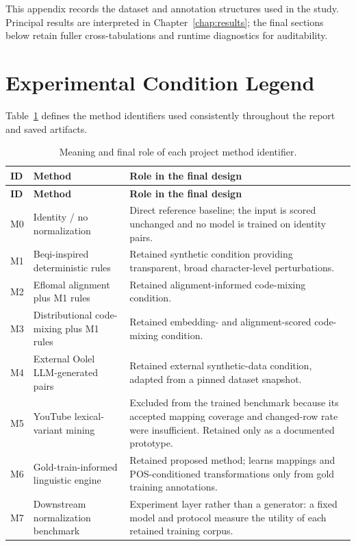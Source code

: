 \documentclass[12pt, a4paper, twoside, openany]{report}
\begin{document}
This appendix records the dataset and annotation structures used in the study. Principal results are interpreted in Chapter~\ref{chap:results}; the final sections below retain fuller cross-tabulations and runtime diagnostics for auditability.

\section{Experimental Condition Legend}

Table~\ref{tab:method-legend} defines the method identifiers used consistently throughout the report and saved artifacts.

\begin{longtable}{p{1.4cm}p{5.0cm}p{7.4cm}}
  \caption{Meaning and final role of each project method identifier.}\label{tab:method-legend}\\
  \toprule
  \textbf{ID} & \textbf{Method} & \textbf{Role in the final design} \\
  \midrule
  \endfirsthead
  \toprule
  \textbf{ID} & \textbf{Method} & \textbf{Role in the final design} \\
  \midrule
  \endhead
  M0 & Identity / no normalization & Direct reference baseline; the input is scored unchanged and no model is trained on identity pairs. \\
  M1 & Beqi-inspired deterministic rules & Retained synthetic condition providing transparent, broad character-level perturbations. \\
  M2 & Eflomal alignment plus M1 rules & Retained alignment-informed code-mixing condition. \\
  M3 & Distributional code-mixing plus M1 rules & Retained embedding- and alignment-scored code-mixing condition. \\
  M4 & External Oolel LLM-generated pairs & Retained external synthetic-data condition, adapted from a pinned dataset snapshot. \\
  M5 & YouTube lexical-variant mining & Excluded from the trained benchmark because its accepted mapping coverage and changed-row rate were insufficient. Retained only as a documented prototype. \\
  M6 & Gold-train-informed linguistic engine & Retained proposed method; learns mappings and POS-conditioned transformations only from gold training annotations. \\
  M7 & Downstream normalization benchmark & Experiment layer rather than a generator: a fixed model and protocol measure the utility of each retained training corpus. \\
  \bottomrule
\end{longtable}
\end{document}
